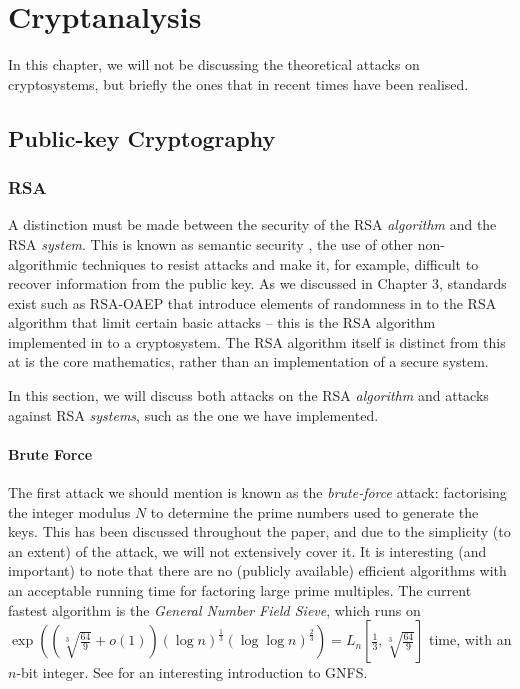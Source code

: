 
\chapter{Cryptanalysis} 
\label{Chapter7}

In this chapter, we will not be discussing the theoretical attacks on cryptosystems, but briefly the ones that in recent times have been realised.

\section{Public-key Cryptography}

  \subsection{RSA}
    
    A distinction must be made between the security of the RSA \emph{algorithm} and the RSA \emph{system}. This is known as semantic security \cite{Goldwasse:1990aa}, the use of other non-algorithmic techniques to resist attacks and make it, for example, difficult to recover information from the public key. As we discussed in Chapter 3, standards exist such as RSA-OAEP that introduce elements of randomness in to the RSA algorithm that limit certain basic attacks -- this is the RSA algorithm implemented in to a cryptosystem. The RSA algorithm itself is distinct from this at is the core mathematics, rather than an implementation of a secure system.
    
    In this section, we will discuss both attacks on the RSA \emph{algorithm} and attacks against RSA \emph{systems}, such as the one we have implemented.
    
    \subsubsection{Brute Force}
    
      The first attack we should mention is known as the \emph{brute-force} attack: factorising the integer modulus $N$ to determine the prime numbers used to generate the keys. This has been discussed throughout the paper, and due to the simplicity (to an extent) of the attack, we will not extensively cover it. It is interesting (and important) to note that there are no (publicly available) efficient algorithms with an acceptable running time for factoring large prime multiples. The current fastest algorithm is the \emph{General Number Field Sieve}, which runs on $\exp\left( \left(\sqrt[3]{\frac{64}{9}} + o(1)\right)(\log n)^{\frac{1}{3}}(\log \log n)^{\frac{2}{3}}\right) =L_n\left[\frac{1}{3},\sqrt[3]{\frac{64}{9}}\right]$ time, with an $n$-bit integer. See \cite{Briggs:1998aa} for an interesting introduction to GNFS.
      
